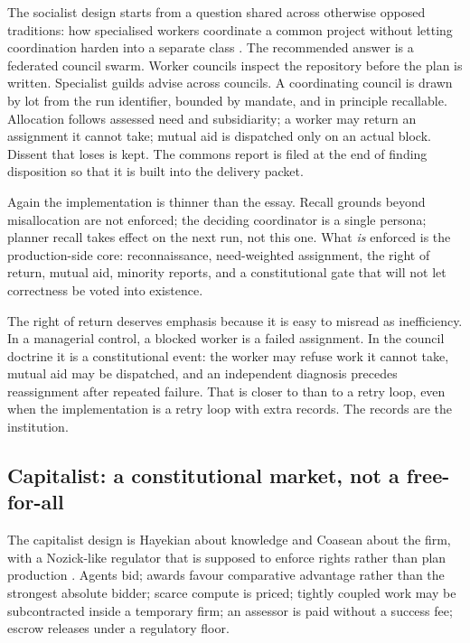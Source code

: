 \documentclass[11pt,a4paper]{article}
\begin{document}
The socialist design starts from a question shared across otherwise opposed traditions:
how specialised workers coordinate a common project without letting coordination harden
into a separate class \citep{marx1871,pannekoek1950,cole1920,kropotkin1902}. The recommended
answer is a federated council swarm. Worker councils inspect the repository before the
plan is written. Specialist guilds advise across councils. A coordinating council is
drawn by lot from the run identifier, bounded by mandate, and in principle recallable.
Allocation follows assessed need and subsidiarity; a worker may return an assignment it
cannot take; mutual aid is dispatched only on an actual block. Dissent that loses is
kept. The commons report is filed at the end of finding disposition so that it is built
into the delivery packet.

Again the implementation is thinner than the essay. Recall grounds beyond misallocation
are not enforced; the deciding coordinator is a single persona; planner recall takes
effect on the next run, not this one. What \emph{is} enforced is the production-side
core: reconnaissance, need-weighted assignment, the right of return, mutual aid, minority
reports, and a constitutional gate that will not let correctness be voted into existence.

The right of return deserves emphasis because it is easy to misread as inefficiency.
In a managerial control, a blocked worker is a failed assignment. In the council
doctrine it is a constitutional event: the worker may refuse work it cannot take, mutual
aid may be dispatched, and an independent diagnosis precedes reassignment after repeated
failure. That is closer to \citet{kropotkin1902} than to a retry loop, even when the
implementation is a retry loop with extra records. The records are the institution.

\subsection{Capitalist: a constitutional market, not a free-for-all}

The capitalist design is Hayekian about knowledge and Coasean about the firm, with a
Nozick-like regulator that is supposed to enforce rights rather than plan production
\citep{hayek1945,coase1937,smith1776,friedman1962,schumpeter1942}. Agents bid; awards
favour comparative advantage rather than the strongest absolute bidder; scarce compute is
priced; tightly coupled work may be subcontracted inside a temporary firm; an assessor is
paid without a success fee; escrow releases under a regulatory floor.
\end{document}
